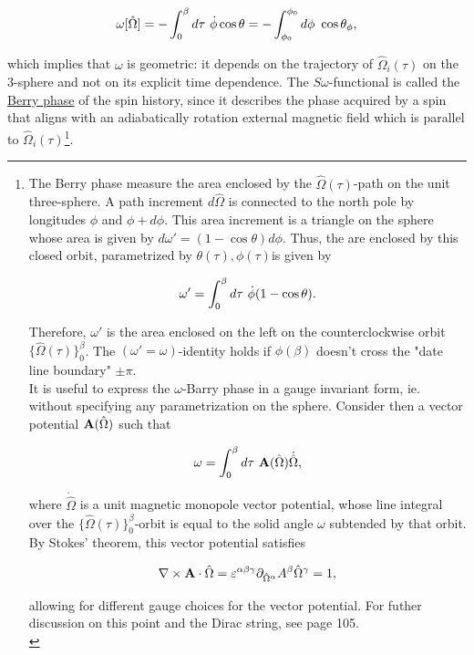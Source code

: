 \documentclass{homework}
\begin{document}
\begin{equation}
    \omega[\hat{\Omega}] = -\int_{0}^\beta d\tau \textnormal{ } \dot{\phi} \cos \theta = - \int_{\phi_0}^{\phi_0} d\phi \textnormal{ } \cos \theta_\phi,
\end{equation}

which implies that $\omega$ is geometric: it depends on the trajectory of $\hat{\Omega}_i(\tau)$ on the 3-sphere and not on its explicit time dependence. The $S\omega$-functional is called the \underline{Berry phase} of the spin history, since it describes the phase acquired by a spin that aligns with an adiabatically rotation external magnetic field which is parallel to $\hat{\Omega}_i(\tau)$\footnote{

The Berry phase measure the area enclosed by the $\hat{\Omega}(\tau)$-path on the unit three-sphere. A path increment $d\hat{\Omega}$ is connected to the north pole by longitudes $\phi$ and $\phi + d\phi$. This area increment is a triangle on the sphere whose area is given by $d\omega' = (1-\cos \theta) d\phi$. Thus, the are enclosed by this closed orbit, parametrized by $\theta(\tau), \phi(\tau)$is given by 

$$
    \omega' = \int_0^\beta d\tau \textnormal{ } \dot{\phi}(1-\cos \theta).
$$

Therefore, $\omega'$ is the area enclosed on the left on the counterclockwise orbit $\{\hat{\Omega}(\tau)\}_0^\beta$. The $(\omega' = \omega)$-identity holds if $\phi(\beta)$ doesn't cross the "date line boundary" $\pm \pi$. \\

It is useful to express the $\omega$-Barry phase in a gauge invariant form, ie. without specifying any parametrization on the sphere. Consider then a vector potential ${\bf A}(\hat{\Omega})$ such that 

$$
    \omega = \int_{0}^{\beta} d\tau \textnormal{ } {\bf A}(\hat{\Omega}) \dot{\hat{\Omega}},
$$

where $\dot{\hat{\Omega}}$ is a unit magnetic monopole vector potential, whose line integral over the $\{\hat{\Omega}(\tau)\}_0^\beta$-orbit is equal to the solid angle $\omega$ subtended by that orbit. By Stokes' theorem, this vector potential satisfies 

\begin{equation}
    \nabla \times {\bf A} \cdot \hat{\Omega} = \varepsilon^{\alpha\beta\gamma} \partial_{{\hat{\Omega}^\alpha}} A^\beta \hat{\Omega}^\gamma = 1,
\end{equation}

allowing for different gauge choices for the vector potential. For futher discussion on this point and the Dirac string, see \cite{assa} page 105. \\

}. \\
\end{document}
